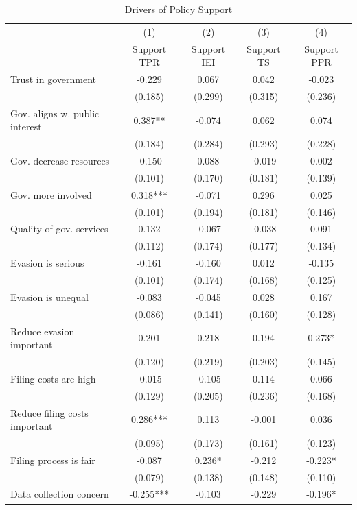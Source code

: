 \documentclass[11pt]{article}
\begin{document}
\begin{table}[!htbp]\centering
\caption{Drivers of Policy Support}
\label{tab:PolicySupportDrivers}
\begin{threeparttable}
\footnotesize
\begin{tabular}{l|cccc}
\toprule
& (1) & (2) & (3) & (4) \\
& Support TPR & Support IEI & Support TS & Support PPR \\
\midrule
Trust in government & -0.229 & 0.067 & 0.042 & -0.023 \\
 & (0.185) & (0.299) & (0.315) & (0.236) \\
Gov. aligns w. public interest & 0.387** & -0.074 & 0.062 & 0.074 \\
 & (0.184) & (0.284) & (0.293) & (0.228) \\
Gov. decrease resources & -0.150 & 0.088 & -0.019 & 0.002 \\
 & (0.101) & (0.170) & (0.181) & (0.139) \\
Gov. more involved & 0.318*** & -0.071 & 0.296 & 0.025 \\
 & (0.101) & (0.194) & (0.181) & (0.146) \\
Quality of gov. services & 0.132 & -0.067 & -0.038 & 0.091 \\
 & (0.112) & (0.174) & (0.177) & (0.134) \\
Evasion is serious & -0.161 & -0.160 & 0.012 & -0.135 \\
 & (0.101) & (0.174) & (0.168) & (0.125) \\
Evasion is unequal & -0.083 & -0.045 & 0.028 & 0.167 \\
 & (0.086) & (0.141) & (0.160) & (0.128) \\
Reduce evasion important & 0.201 & 0.218 & 0.194 & 0.273* \\
 & (0.120) & (0.219) & (0.203) & (0.145) \\
Filing costs are high & -0.015 & -0.105 & 0.114 & 0.066 \\
 & (0.129) & (0.205) & (0.236) & (0.168) \\
Reduce filing costs important & 0.286*** & 0.113 & -0.001 & 0.036 \\
 & (0.095) & (0.173) & (0.161) & (0.123) \\
Filing process is fair & -0.087 & 0.236* & -0.212 & -0.223* \\
 & (0.079) & (0.138) & (0.148) & (0.110) \\
Data collection concern & -0.255*** & -0.103 & -0.229 & -0.196* \\

\end{tabular}
\end{threeparttable}
\end{table}
\end{document}
